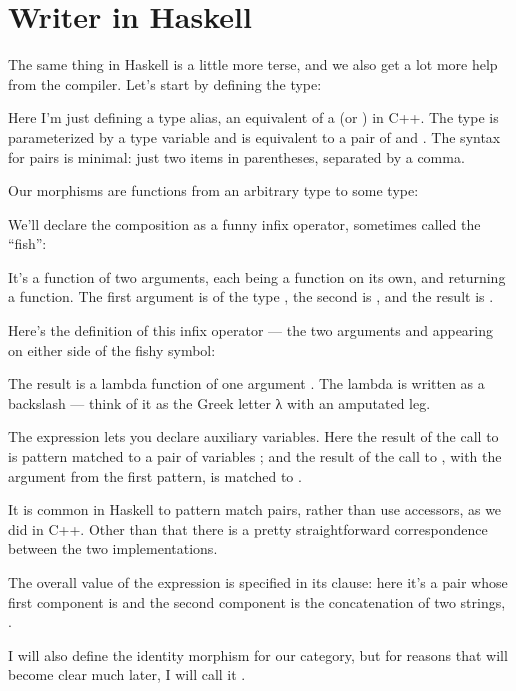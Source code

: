 \section{Writer in Haskell}

The same thing in Haskell is a little more terse, and we also get a lot
more help from the compiler. Let's start by defining the 
type:

Here I'm just defining a type alias, an equivalent of a 
(or ) in C++. The type  is parameterized by
a type variable  and is equivalent to a pair of  and
. The syntax for pairs is minimal: just two items in
parentheses, separated by a comma.

Our morphisms are functions from an arbitrary type to some
 type:

We'll declare the composition as a funny infix operator, sometimes
called the ``fish'':

It's a function of two arguments, each being a function on its own, and
returning a function. The first argument is of the type
, the second is
, and the result is
.

Here's the definition of this infix operator --- the two arguments
 and  appearing on either side of the fishy
symbol:

The result is a lambda function of one argument . The lambda
is written as a backslash --- think of it as the Greek letter λ with an
amputated leg.

The  expression lets you declare auxiliary variables. Here
the result of the call to  is pattern matched to a pair of
variables ; and the result of the call to ,
with the argument  from the first pattern, is matched to
.

It is common in Haskell to pattern match pairs, rather than use
accessors, as we did in C++. Other than that there is a pretty
straightforward correspondence between the two implementations.

The overall value of the  expression is specified in its
 clause: here it's a pair whose first component is 
and the second component is the concatenation of two strings,
.

I will also define the identity morphism for our category, but for
reasons that will become clear much later, I will call it
.

